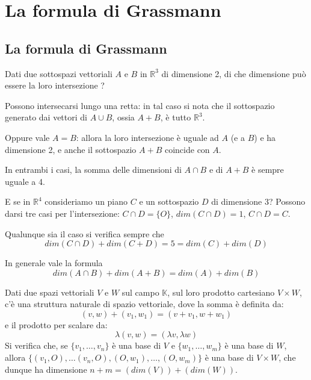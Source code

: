 
\section{La formula di Grassmann}
\subsection{La formula di Grassmann}

Dati due sottospazi vettoriali $A$ e $B$ in $\mathbb{R}^3$ di dimensione 2,
di che dimensione pu\`o essere la loro intersezione ?

Possono intersecarsi lungo una retta: in tal caso si nota che il sottospazio
generato dai vettori di $A \cup B$, ossia $A + B$, \`e tutto $\mathbb{R}^3$.

Oppure vale $A = B$: allora la loro intersezione \`e uguale ad $A$ (e a $B$) e
ha dimensione 2, e anche il sottospazio $A + B$ coincide con $A$.

In entrambi i casi, la somma delle dimensioni di $A \cap B$ e di $A + B$ \`e
sempre uguale a 4.

E se in $\mathbb{R}^4$ consideriamo un piano $C$ e un sottospazio $D$ di
dimensione 3?
Possono darsi tre casi per l'intersezione: $C \cap D = \{O\}$,
$dim(C \cap D) = 1$, $C \cap D = C$.

Qualunque sia il caso si verifica sempre che
\begin{equation*}
	dim(C \cap D) + dim(C + D) = 5 = dim(C) + dim(D)
\end{equation*}

In generale vale la formula
\begin{equation*}
	dim(A \cap B) + dim(A + B) = dim(A) + dim(B)
\end{equation*}

Dati due spazi vettoriali $V$ e $W$ sul campo $\mathbb{K}$, sul loro prodotto
cartesiano $V \times W$, c'\`e una struttura naturale di spazio vettoriale, dove
la somma \`e definita da:
\begin{equation*}
	(v, w) + (v_1, w_1) = (v + v_1, w + w_1)
\end{equation*}
e il prodotto per scalare da:
\begin{equation*}
	\lambda(v, w) = (\lambda v, \lambda w)
\end{equation*}
Si verifica che, se $\{v_1, \dots, v_n\}$ \`e una base di $V$
e $\{w_1, \dots, w_m\}$ \`e una base di $W$, allora
$\{(v_1, O), \dots (v_n, O), (O, w_1), \dots, (O, w_m)\}$ \`e una base di
$V \times W$, che dunque ha dimensione $n + m = (dim(V)) + (dim(W))$.


